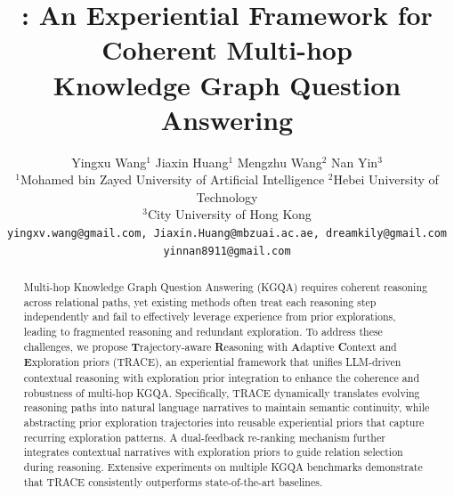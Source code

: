 \documentclass[11pt]{article}
\author{
Yingxu Wang$^{1}$ \quad
Jiaxin Huang$^{1}$ \quad
Mengzhu Wang$^{2}$ \quad
Nan Yin$^{3}$ \\
$^{1}$Mohamed bin Zayed University of Artificial Intelligence \quad
$^{2}$Hebei University of Technology \\
$^{3}$City University of Hong Kong \\
\texttt{yingxv.wang@gmail.com, Jiaxin.Huang@mbzuai.ac.ae, dreamkily@gmail.com} \\
\texttt{yinnan8911@gmail.com}
}
\title{\method{}: An Experiential Framework for Coherent Multi-hop \\ Knowledge Graph Question Answering}
\def \method{TRACE}
\begin{document}
\maketitle
\begin{abstract}


Multi-hop Knowledge Graph Question Answering (KGQA) requires coherent reasoning across relational paths, yet existing methods often treat each reasoning step independently and fail to effectively leverage experience from prior explorations, leading to fragmented reasoning and redundant exploration. To address these challenges, we propose \textbf{T}rajectory-aware \textbf{R}easoning with \textbf{A}daptive \textbf{C}ontext and \textbf{E}xploration priors (\method{}), an experiential framework that unifies LLM-driven contextual reasoning with exploration prior integration to enhance the coherence and robustness of multi-hop KGQA. Specifically, \method{} dynamically translates evolving reasoning paths into natural language narratives to maintain semantic continuity, while abstracting prior exploration trajectories into reusable experiential priors that capture recurring exploration patterns. A dual-feedback re-ranking mechanism further integrates contextual narratives with exploration priors to guide relation selection during reasoning. Extensive experiments on multiple KGQA benchmarks demonstrate that \method{} consistently outperforms state-of-the-art baselines.
\end{abstract}











\newpage
\appendix

\end{document}
